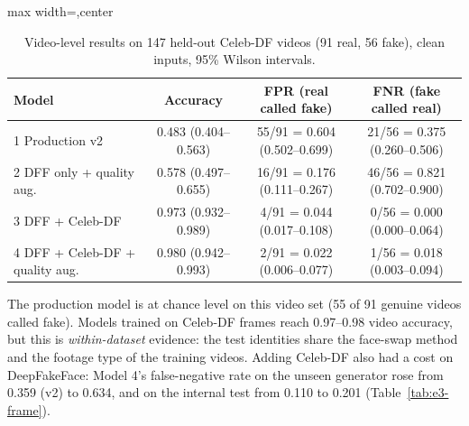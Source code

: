 \begin{table}[ht]
\centering
\caption[Video-level results on 147 held-out Celeb-DF videos (91 real, 56 fake), clean inputs, 95\%]{Video-level results on 147 held-out Celeb-DF videos (91 real, 56 fake), clean inputs, 95\% Wilson intervals.}
\label{tab:fourvideo}
\small
\begin{adjustbox}{max width=\linewidth,center}
\begin{tabular}{|l|c|c|c|}
\hline
\textbf{Model} & \textbf{Accuracy} & \textbf{FPR (real called fake)} & \textbf{FNR (fake called real)} \\ \hline
1 Production v2 & 0.483 (0.404--0.563) & 55/91 = 0.604 (0.502--0.699) & 21/56 = 0.375 (0.260--0.506) \\ \hline
2 DFF only + quality aug. & 0.578 (0.497--0.655) & 16/91 = 0.176 (0.111--0.267) & 46/56 = 0.821 (0.702--0.900) \\ \hline
3 DFF + Celeb-DF & 0.973 (0.932--0.989) & 4/91 = 0.044 (0.017--0.108) & 0/56 = 0.000 (0.000--0.064) \\ \hline
4 DFF + Celeb-DF + quality aug. & 0.980 (0.942--0.993) & 2/91 = 0.022 (0.006--0.077) & 1/56 = 0.018 (0.003--0.094) \\ \hline
\end{tabular}
\end{adjustbox}
\end{table}

The production model is at chance level on this video set (55 of 91 genuine videos called fake). Models trained on Celeb-DF frames reach
0.97--0.98 video accuracy, but this is \emph{within-dataset} evidence: the test identities share the face-swap method and the footage type of the training videos.
Adding Celeb-DF also had a cost on DeepFakeFace: Model 4's false-negative rate on the unseen generator rose from 0.359 (v2) to 0.634, and on the internal test from 0.110 to 0.201 (Table~\ref{tab:e3-frame}).

